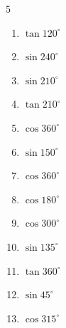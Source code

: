 \begin{multicols}{5}
\begin{enumerate}
  \item $\displaystyle \tan{120^\circ}$


  \item $\displaystyle \sin{240^\circ}$


  \item $\displaystyle \sin{210^\circ}$


  \item $\displaystyle \tan{210^\circ}$


  \item $\displaystyle \cos{360^\circ}$

        \phantom{$\displaystyle =1$}

  \item $\displaystyle \sin{150^\circ}$


  \item $\displaystyle \cos{360^\circ}$

        \phantom{$\displaystyle =1$}

  \item $\displaystyle \cos{180^\circ}$

        \phantom{$\displaystyle =-1$}

\columnbreak %

  \item $\displaystyle \cos{300^\circ}$


  \item $\displaystyle \sin{135^\circ}$


  \item $\displaystyle \tan{360^\circ}$

        \phantom{$\displaystyle =0$}

  \item $\displaystyle \sin{45^\circ}$


  \item $\displaystyle \cos{315^\circ}$


\end{enumerate}
\end{multicols}
